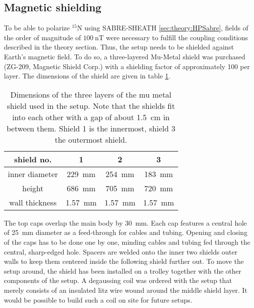         \subsection{Magnetic shielding}
        To be able to polarize $^{15}\mathrm{N}$ using SABRE-SHEATH \ref{sec:theory:HPSabre}, fields of the order of magnitude of $\SI{100}{\nano\tesla}$ were necessary to fulfill the coupling conditions described in the theory section. Thus, the setup needs to be shielded against Earth's magnetic field. To do so, a three-layered Mu-Metal shield was purchased (ZG-209, Magnetic Shield Corp.) with a shielding factor of approximately 100 per layer. The dimensions of the shield are given in table \ref{table:matMeth:muMetalDims}.
            \begin{table}
                \centering
                \begin{tabular}{|c|ccc|}
                    \hline
                    shield no. & 1 & 2 & 3 \\
                    \hline
                    inner diameter &  \SI{229}{\mm}& \SI{254}{\mm}& \SI{183}{\mm}\\
                    height & \SI{686}{\mm}& \SI{705}{\mm}& \SI{720}\mm\\
                    wall thickness&\SI{1.57}{\mm}&\SI{1.57}{\mm}&\SI{1.57}{\mm}\\
                    \hline
                \end{tabular}
                \caption[Shield dimensions]{Dimensions of the three layers of the mu metal shield used in the setup. Note that the shields fit into each other with a gap of about \SI{1.5}{\cm} in between them. Shield 1 is the innermost, shield 3 the outermost shield.}
                \label{table:matMeth:muMetalDims}
            \end{table}
            The top caps overlap the main body by \SI{30}{\mm}.  Each cap features a central hole of \SI{25}{\mm} diameter as a feed-through for cables and tubing. Opening and closing of the caps has to be done one by one, minding cables and tubing fed through the central, sharp-edged hole. Spacers are welded onto the inner two shields outer walls to keep them centered inside the following shield further out. To move the setup around, the shield has been installed on a trolley together with the other components of the setup.  A degaussing coil was ordered with the setup that merely consists of an insulated litz wire wound around the middle shield layer.  It would be possible to build such a coil on site for future setups.
